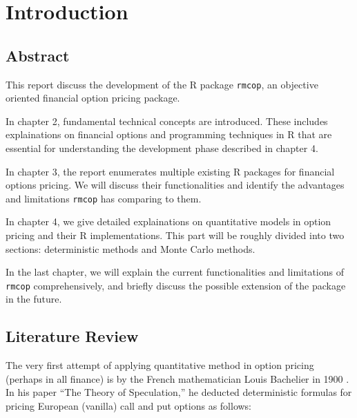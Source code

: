 \chapter{Introduction}

\section{Abstract}
This report discuss the development of the R package \texttt{rmcop}, an objective oriented financial option pricing package.

In chapter 2, fundamental technical concepts are introduced. These includes explainations on financial options and programming techniques in R that are essential for understanding the development phase described in chapter 4.

In chapter 3, the report enumerates multiple existing R packages for financial options pricing. We will discuss their functionalities and identify the advantages and limitations \texttt{rmcop} has comparing to them.

In chapter 4, we give detailed explainations on quantitative models in option pricing and their R implementations. This part will be roughly divided into two sections: deterministic methods and Monte Carlo methods.

In the last chapter, we will explain the current functionalities and limitations of \texttt{rmcop} comprehensively, and briefly discuss the possible extension of the package in the future.

\section{Literature Review}
The very first attempt of applying quantitative method in option pricing (perhaps in all finance) is by the French mathematician Louis Bachelier in 1900 \cite{Bachelier1900}. In his paper ``The Theory of Speculation,'' he deducted deterministic formulas for pricing European (vanilla) call and put options as follows:


